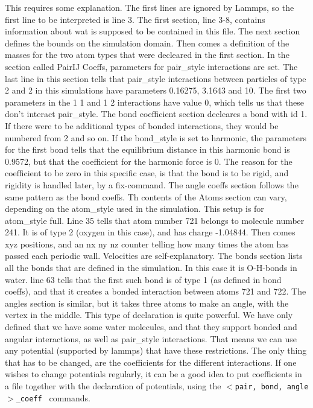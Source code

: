This requires some explanation. The first lines are ignored by Lammps, so the first line to be interpreted is line 3. The first section, line 3-8, contains information about wat is supposed to be contained in this file. The next section defines the bounds on the simulation domain. Then comes a definition of the masses for the two atom types that were decleared in the first section. In the section called PairIJ Coeffs, parameters for pair\_style interactions are set. The last line in this section tells that pair\_style interactions between particles of type 2 and 2 in this simulations have parameters 0.16275, 3.1643 and 10. The first two parameters in the 1 1 and 1 2 interactions have value 0, which tells us that these don't interact pair\_style. The bond coefficient section decleares a bond with id 1. If there were to be additional types of bonded interactions, they would be numbered from 2 and so on. If the bond\_style is set to harmonic, the parameters for the first bond tells that the equilibrium distance in this harmonic bond is 0.9572, but that the coefficient for the harmonic force is 0. The reason for the coefficient to be zero in this specific case, is that the bond is to be rigid, and rigidity is handled later, by a fix-command. The angle coeffs section follows the same pattern as the bond coeffs. Th contents of the Atoms section can vary, depending on the atom\_style used in the simulation. This setup is for atom\_style full. Line 35 tells that atom number 721 belongs to molecule number 241. It is of type 2 (oxygen in this case), and has charge -1.04844. Then comes xyz positions, and an nx ny nz counter telling how many times the atom has passed each periodic wall. Velocities are self-explanatory. The bonds section lists all the bonds that are defined in the simulation. In this case it is O-H-bonds in water. line 63 tells that the first such bond is of type 1 (as defined in bond coeffs), and that it creates a bonded interaction between atoms 721 and 722. The angles section is similar, but it takes three atoms to make an angle, with the vertex in the middle. This type of declaration is quite powerful. We have only defined that we have some water molecules, and that they support bonded and angular interactions, as well as pair\_style interactions. That means we can use any potential (supported by lammps) that have these restrictions. The only thing that has to be changed, are the coefficients for the different interactions. If one wishes to change potentials regularly, it can be a good idea to put coefficients in a file together with the declaration of potentials, using the {\tt $<$pair, bond, angle$>$\_coeff } commands. 




